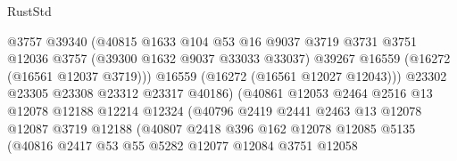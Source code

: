 \begin{lexlean}{RustStd}
\begin{coremodule}
                                    @3757
                                    @39340
                                    (@40815
                                      @1633
                                      @104
                                      @53
                                      @16
                                      @9037
                                      @3719
                                      @3731
                                      @3751
                                      @12036
                                      @3757
                                      (@39300 @1632 @9037 @33033 @33037)
                                      @39267
                                      @16559
                                      (@16272 (@16561 @12037 @3719)))
                                    @16559
                                    (@16272 (@16561 @12027 @12043)))
                                  @23302
                                  @23305
                                  @23308
                                  @23312
                                  @23317
                                  @40186)
                                (@40861
                                  @12053
                                  @2464
                                  @2516
                                  @13
                                  @12078
                                  @12188
                                  @12214
                                  @12324
                                  (@40796
                                    @2419
                                    @2441
                                    @2463
                                    @13
                                    @12078
                                    @12087
                                    @3719
                                    @12188
                                    (@40807
                                      @2418
                                      @396
                                      @162
                                      @12078
                                      @12085
                                      @5135
                                      (@40816
                                        @2417
                                        @53
                                        @55
                                        @5282
                                        @12077
                                        @12084
                                        @3751
                                        @12058

\end{coremodule}
\end{lexlean}
